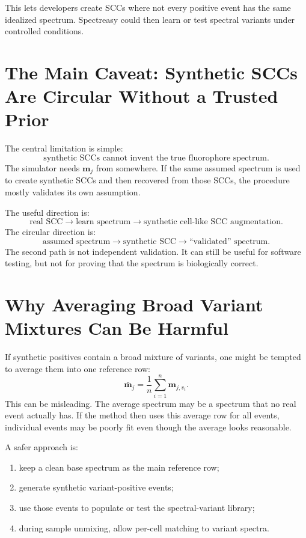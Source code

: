 \documentclass[11pt]{article}
\newcommand{\m}{\mathbf{m}}
\begin{document}
This lets developers create SCCs where not every positive event has the same
idealized spectrum. Spectreasy could then learn or test spectral variants under
controlled conditions.

\section{The Main Caveat: Synthetic SCCs Are Circular Without a Trusted Prior}

The central limitation is simple:
\begin{equation}
  \text{synthetic SCCs cannot invent the true fluorophore spectrum}.
\end{equation}
The simulator needs \(\m_j\) from somewhere. If the same assumed spectrum is
used to create synthetic SCCs and then recovered from those SCCs, the procedure
mostly validates its own assumption.

The useful direction is:
\begin{equation}
  \text{real SCC}
  \rightarrow
  \text{learn spectrum}
  \rightarrow
  \text{synthetic cell-like SCC augmentation}.
\end{equation}
The circular direction is:
\begin{equation}
  \text{assumed spectrum}
  \rightarrow
  \text{synthetic SCC}
  \rightarrow
  \text{``validated'' spectrum}.
\end{equation}
The second path is not independent validation. It can still be useful for
software testing, but not for proving that the spectrum is biologically correct.

\section{Why Averaging Broad Variant Mixtures Can Be Harmful}

If synthetic positives contain a broad mixture of variants, one might be tempted
to average them into one reference row:
\begin{equation}
  \bar{\m}_j
  =
  \frac{1}{n}
  \sum_{i=1}^{n}
  \m_{j,v_i}.
\end{equation}
This can be misleading. The average spectrum may be a spectrum that no real
event actually has. If the method then uses this average row for all events,
individual events may be poorly fit even though the average looks reasonable.

A safer approach is:
\begin{enumerate}
  \item keep a clean base spectrum as the main reference row;
  \item generate synthetic variant-positive events;
  \item use those events to populate or test the spectral-variant library;
  \item during sample unmixing, allow per-cell matching to variant spectra.
\end{enumerate}
\end{document}
